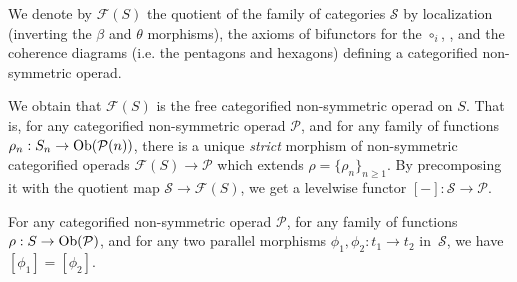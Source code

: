\begin{definition}
    We denote by $\mathcal{F}(S)$ the quotient of the family of categories $\mathcal{S}$ by localization (inverting the $\beta$ and $\theta$ morphisms), the axioms of bifunctors for the $\circ_i$, , and the coherence diagrams (i.e. the pentagons and hexagons) defining a categorified non-symmetric operad. 
\end{definition}

We obtain that $\mathcal{F}(S)$ is the free categorified non-symmetric operad on $S$. 
That is, for any categorified non-symmetric operad $\mathcal{P}$, and for any family of functions $\rho_n : S_n \to \mathrm{Ob}(\mathcal{P}(n))$, there is a unique \emph{strict} morphism of non-symmetric categorified operads $\mathcal{F}(S) \to \mathcal{P}$ which extends $\rho=\{\rho_n\}_{n\geq 1}$. 
By precomposing it with the quotient map $\mathcal{S} \to \mathcal{F}(S)$, we get a levelwise functor $[-]:\mathcal{S} \to \mathcal{P}$.

\begin{thm}
\label{thm:coherence-operahedra}
    For any categorified non-symmetric operad $\mathcal{P}$, for any family of functions $\rho : S \to \mathrm{Ob}(\mathcal{P})$, and for any two parallel morphisms $\phi_1,\phi_2: t_1 \to t_2$ in~$\mathcal{S}$, we have $[\phi_1]=[\phi_2]$.
\end{thm}

